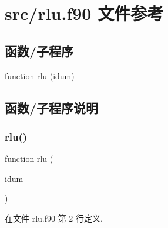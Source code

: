 \hypertarget{rlu_8f90}{}\section{src/rlu.f90 文件参考}
\label{rlu_8f90}
\subsection*{函数/子程序}
\begin{DoxyCompactItemize}
\item 
function \mbox{\hyperlink{rlu_8f90_a6b38caf89e085f54e77042a37a775ba6}{rlu}} (idum)
\end{DoxyCompactItemize}


\subsection{函数/子程序说明}
\mbox{\label{rlu_8f90_a6b38caf89e085f54e77042a37a775ba6}} 
\subsubsection{\texorpdfstring{rlu()}{rlu()}}
{\footnotesize\ttfamily function rlu (\begin{DoxyParamCaption}\item[{}]{idum }\end{DoxyParamCaption})}



在文件 rlu.\+f90 第 2 行定义.

